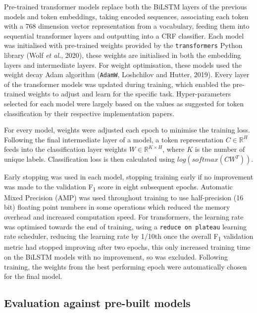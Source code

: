 \documentclass[
  letterpaper,
  11pt,
  english,
  onehalfspacing,
  headsepline]{MastersDoctoralThesis}
\begin{document}
Pre-trained transformer models replace both the BiLSTM layers of the
previous models and token embeddings, taking encoded sequences,
associating each token with a 768 dimension vector representation from a
vocabulary, feeding them into sequential transformer layers and
outputting into a CRF classifier. Each model was initialised with
pre-trained weights provided by the \texttt{transformers} Python library
(Wolf \emph{et al.}, 2020), these weights are initialised in both the
embedding layers and intermediate layers. For weight optimisation, these
models used the weight decay Adam algorithm (\texttt{AdamW}, Loshchilov
and Hutter, 2019). Every layer of the transformer models was updated
during training, which enabled the pre-trained weights to adjust and
learn for the specific task. Hyper-parameters selected for each model
were largely based on the values as suggested for token classification
by their respective implementation papers.

For every model, weights were adjusted each epoch to minimise the
training loss. Following the final intermediate layer of a model, a
token representation \(C\in\mathbb{R}^H\) feeds into the classification
layer weights \(W\in\mathbb{R}^{K\times H}\), where \(K\) is the number
of unique labels. Classification loss is then calculated using
\(log(softmax(CW^T))\).

Early stopping was used in each model, stopping training early if no
improvement was made to the validation F\textsubscript{1} score in eight
subsequent epochs. Automatic Mixed Precision (AMP) was used throughout
training to use half-precision (16 bit) floating point numbers in some
operations which reduced the memory overhead and increased computation
speed. For transformers, the learning rate was optimised towards the end
of training, using a \texttt{reduce\ on\ plateau} learning rate
scheduler, reducing the learning rate by 1/10th once the overall
F\textsubscript{1} validation metric had stopped improving after two
epochs, this only increased training time on the BiLSTM models with no
improvement, so was excluded. Following training, the weights from the
best performing epoch were automatically chosen for the final model.

\hypertarget{evaluation-against-pre-built-models}{%
\subsection{Evaluation against pre-built
models}\label{evaluation-against-pre-built-models}}
\end{document}

